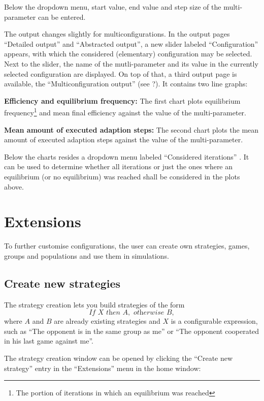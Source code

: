 \documentclass[parskip=full,11pt]{scrartcl}
\newcommand*\circled[1]{\tikz[baseline=(char.base)]{
            \node[shape=circle,draw,inner sep=2pt] (char) {#1};}}
\begin{document}
Below the dropdown menu, start value, end value and step size of the multi-parameter can be entered.

The output changes slightly for multiconfigurations. In the output pages \enquote{Detailed output} and \enquote{Abstracted output}, a new slider labeled \enquote{Configuration} appears, with which the considered (elementary) configuration may be selected. Next to the slider, the name of the mutli-parameter and its value in the currently selected configuration are displayed. On top of that, a third output page is available, the \enquote{Multiconfiguration output} (see ?). It contains two line graphs:

\textbf{Efficiency and equilibrium frequency:} The first chart plots equilibrium frequency\footnote{The portion of iterations in which an equilibrium was reached} and mean final efficiency against the value of the multi-parameter.

\textbf{Mean amount of executed adaption steps:} The second chart plots the mean amount of executed adaption steps against the value of the multi-parameter.

Below the charts resides a dropdown menu labeled \enquote{Considered iterations} \circled{4}. It can be used to determine whether all iterations or just the ones where an equilibrium (or no equilibrium) was reached shall be considered in the plots above.

\pagebreak
\section{Extensions}

To further customise configurations, the user can create own strategies, games, groups and populations and use them in simulations.

\subsection{Create new strategies}
The strategy creation lets you build strategies of the form
\begin{equation}
\textit{If } X \textit{ then } A, \textit{ otherwise } B,
\end{equation}\label{eq:strategy}
where \(A\) and \(B\) are already existing strategies and \(X\) is a configurable expression, such as \enquote{The opponent is in the same group as me} or \enquote{The opponent cooperated in his last game against me}.

The strategy creation window can be opened by clicking the \enquote{Create new strategy} entry in the \enquote{Extensions} menu in the home window:
\end{document}
